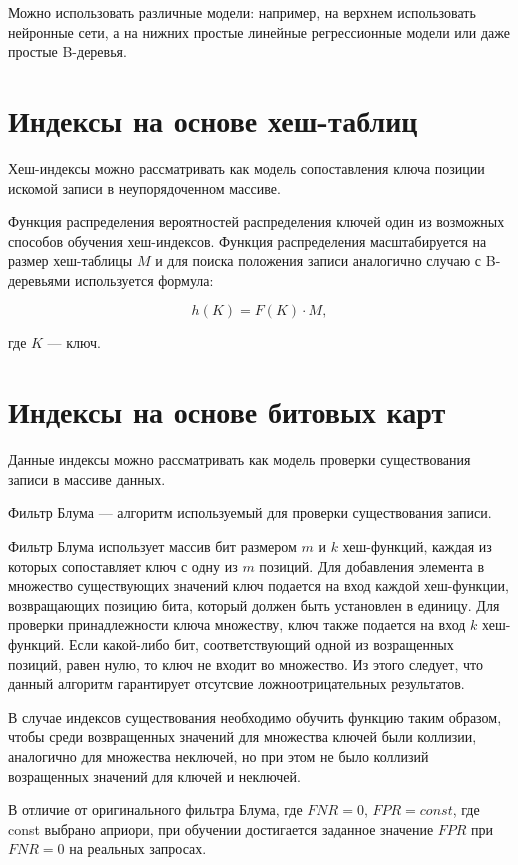 Можно использовать различные модели: например, на верхнем использовать нейронные
сети, а на нижних простые линейные регрессионные модели или даже простые
B-деревья.

\section{Индексы на основе хеш-таблиц}

Хеш-индексы можно рассматривать как модель сопоставления ключа позиции
искомой записи в неупорядоченном массиве.


Функция распределения вероятностей распределения ключей  один из возможных
способов обучения хеш-индексов. Функция распределения масштабируется на размер
хеш-таблицы $M$ и для поиска положения записи аналогично случаю с B-деревьями
используется формула:

\begin{equation}
    h(K) = F(K) \cdot M,
\end{equation}

где $K$ --- ключ.

\section{Индексы на основе битовых карт}

Данные индексы можно рассматривать как модель проверки существования записи в
массиве данных.

Фильтр Блума --- алгоритм используемый для проверки существования записи.

Фильтр Блума использует массив бит размером $m$ и $k$ хеш-функций, каждая из
которых сопоставляет ключ с одну из $m$ позиций. Для добавления элемента в
множество существующих значений ключ подается на вход каждой хеш-функции,
возвращающих позицию бита, который должен быть установлен в единицу. Для проверки
принадлежности ключа множеству, ключ также подается на вход $k$ хеш-функций.
Если какой-либо бит, соответствующий одной из возращенных позиций, равен нулю,
то ключ не входит во множество. Из этого следует, что данный алгоритм гарантирует
отсутсвие ложноотрицательных результатов.



В случае индексов существования необходимо обучить функцию таким образом, чтобы
среди возвращенных значений для множества ключей были коллизии, аналогично для
множества неключей, но при этом не было коллизий возращенных значений для ключей
и неключей. 

В отличие от оригинального фильтра Блума, где $FNR = 0$, $FPR = const$, где
const выбрано априори, при обучении достигается заданное значение $FPR$ при $FNR
= 0$ на реальных запросах.
